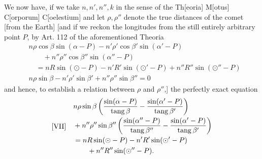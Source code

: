 We now have, if we take \(n,n',n'',k\) in the sense of the Th[eoria] M[otus] C[orporum] C[oelestium] and let \(\rho,\rho''\) denote the true distances of the comet [from the Earth] [and if we reckon the longitudes from the still entirely arbitrary point \(P\), by Art. 112 of the aforementioned
Theoria
\[
\begin{aligned}
&n\rho\cos\beta\sin(\alpha-P)-n'\rho'\cos\beta'\sin(\alpha'-P)\\
&\qquad{}+n''\rho''\cos\beta''\sin(\alpha''-P)\\
&\quad=nR\sin(\odot-P)-n'R'\sin(\odot'-P)+n''R''\sin(\odot''-P)\\
&n\rho\sin\beta-n'\rho'\sin\beta'+n''\rho''\sin\beta''=0
\end{aligned}
\]
and hence, to establish a relation between \(\rho\) and \(\rho''\),] the perfectly exact equation
\[
\begin{array}{l@{\quad}l}
[\mathrm{VII}]&\begin{aligned}
&n\rho\sin\beta\left(\frac{\sin(\alpha-P)}{\operatorname{tang}\beta}-\frac{\sin(\alpha'-P)}{\operatorname{tang}\beta'}\right)\\
&{}+n''\rho''\sin\beta''\left(\frac{\sin(\alpha''-P)}{\operatorname{tang}\beta''}-\frac{\sin(\alpha'-P)}{\operatorname{tang}\beta'}\right)\\
&=nR\sin(\odot-P)-n'R'\sin(\odot'-P)\\
&\qquad{}+n''R''\sin(\odot''-P).
\end{aligned}
\end{array}
\]

